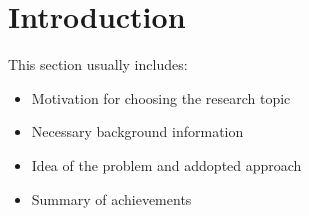 \chapter{Introduction}
\noindent 
This section usually includes:
\begin{itemize}
\item Motivation for choosing the research topic
\item Necessary background information
\item Idea of the problem and addopted approach
\item Summary of achievements
\end{itemize}

